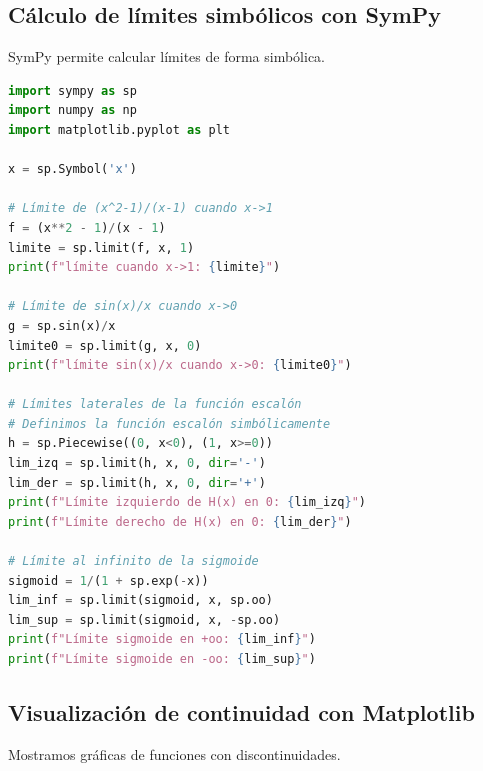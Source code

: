 \documentclass[12pt,a4paper,openany,oneside]{book}
\begin{document}
\subsection{Cálculo de límites simbólicos con SymPy}
SymPy permite calcular límites de forma simbólica.

\begin{lstlisting}[language=Python]
import sympy as sp
import numpy as np
import matplotlib.pyplot as plt

x = sp.Symbol('x')

# Límite de (x^2-1)/(x-1) cuando x->1
f = (x**2 - 1)/(x - 1)
limite = sp.limit(f, x, 1)
print(f"límite cuando x->1: {limite}")

# Límite de sin(x)/x cuando x->0
g = sp.sin(x)/x
limite0 = sp.limit(g, x, 0)
print(f"límite sin(x)/x cuando x->0: {limite0}")

# Límites laterales de la función escalón
# Definimos la función escalón simbólicamente
h = sp.Piecewise((0, x<0), (1, x>=0))
lim_izq = sp.limit(h, x, 0, dir='-')
lim_der = sp.limit(h, x, 0, dir='+')
print(f"Límite izquierdo de H(x) en 0: {lim_izq}")
print(f"Límite derecho de H(x) en 0: {lim_der}")

# Límite al infinito de la sigmoide
sigmoid = 1/(1 + sp.exp(-x))
lim_inf = sp.limit(sigmoid, x, sp.oo)
lim_sup = sp.limit(sigmoid, x, -sp.oo)
print(f"Límite sigmoide en +oo: {lim_inf}")
print(f"Límite sigmoide en -oo: {lim_sup}")
\end{lstlisting}

\subsection{Visualización de continuidad con Matplotlib}
Mostramos gráficas de funciones con discontinuidades.
\end{document}
